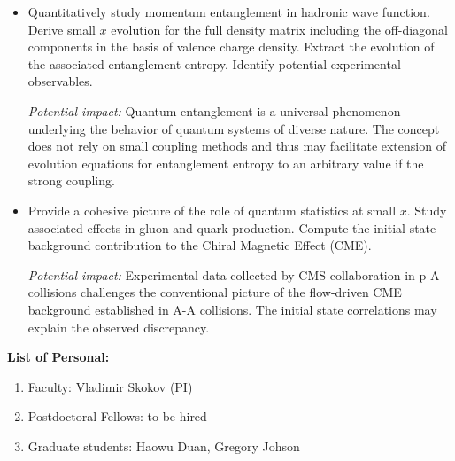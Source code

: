 \begin{itemize}
	\item Quantitatively study momentum entanglement in hadronic wave function. Derive 
		small $x$ evolution for the full density matrix including the off-diagonal components 
		in the basis of valence charge density. 
		Extract the evolution of the associated entanglement entropy. Identify potential 
		experimental observables. 

		{\it Potential impact:} Quantum entanglement is a universal phenomenon underlying 
		the behavior of quantum systems of diverse nature. The concept
		does not rely on small coupling methods and thus may facilitate extension of 
		evolution equations for entanglement entropy to an arbitrary value if the strong coupling.     
		

	\item Provide a cohesive picture of the role of quantum statistics at small $x$. 
		Study associated effects in gluon and quark production. Compute the initial state
		background contribution to the Chiral Magnetic Effect (CME). 
		
		{\it Potential impact:} Experimental data collected by CMS collaboration in p-A collisions
		challenges the conventional picture of the flow-driven CME background established in A-A
		collisions. The initial state correlations may explain the observed discrepancy.     


\end{itemize}

\vspace{0.5em}
\noindent
{\bf List of Personal:}
\begin{enumerate}
	\item Faculty: Vladimir Skokov (PI)
	\item Postdoctoral Fellows: to be hired 
	\item Graduate students:  Haowu Duan,  Gregory Johson 
\end{enumerate}

